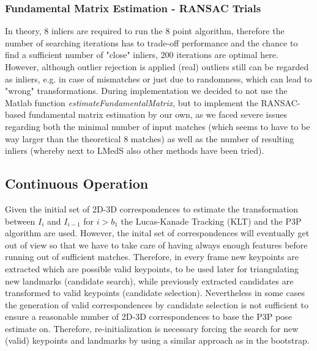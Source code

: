 \documentclass[letterpaper, 12 pt]{article}
\begin{document}
\begin{multicols*}{2}
\subsubsection{Fundamental Matrix Estimation - RANSAC Trials}
In theory, 8 inliers are required to run the 8 point algorithm, therefore the number of searching iterations has to trade-off performance and the chance to find a  sufficient number of "close" inliers, $200$ iterations are optimal here. However, although outlier rejection is applied (real) outliers still can be regarded as inliers, e.g. in case of mismatches or just due to randomness, which can lead to "wrong" transformations.
\newline 
During implementation we decided to not use the Matlab function \textit{estimateFundamentalMatrix}, but to implement the RANSAC-based fundamental matrix estimation by our own, as we faced severe issues regarding both the minimal number of input matches (which seems to have to be way larger than the theoretical 8 matches) as well as the number of resulting inliers (whereby next to LMedS also other methods have been tried). 

\subsection{Continuous Operation}
Given the initial set of 2D-3D correspondences to estimate the transformation between $I_i$ and $I_{i-1}$ for $i > b_1$ the Lucas-Kanade Tracking (KLT) and the P3P algorithm are used. However, the inital set of correspondences will eventually get out of view so that we have to take care of having always enough features before running out of sufficient matches. Therefore, in every frame new keypoints are extracted which are possible valid keypoints, to be used later for triangulating new landmarks (candidate search), while previously extracted candidates are transformed to valid keypoints (candidate selection). Nevertheless in some cases the generation of valid correspondences by candidate selection is not sufficient to ensure a reasonable number of 2D-3D correspondences to base the P3P pose estimate on. Therefore, re-initialization is necessary forcing the search for new (valid) keypoints and landmarks by using a similar approach as in the bootstrap.


\end{multicols*}
\end{document}
